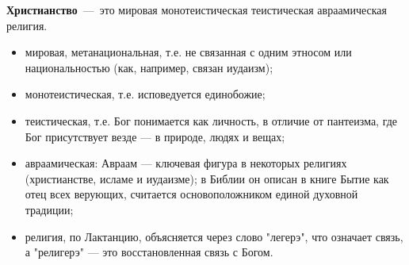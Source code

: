 \textbf{Христианство}~---~это мировая монотеистическая теистическая авраамическая религия.

\begin{itemize}
    \item мировая, метанациональная, т.е. не связанная с одним этносом или национальностью (как, например, связан иудаизм);
    \item монотеистическая, т.е. исповедуется единобожие;
    \item теистическая, т.е. Бог понимается как личность, в отличие от пантеизма, где  Бог присутствует везде — в природе, людях и вещах;
    \item авраамическая: Авраам — ключевая фигура в некоторых религиях (христианстве, исламе и иудаизме); в Библии он описан в книге Бытие как отец всех верующих, считается основоположником единой духовной традиции;
    \item религия, по Лактанцию, объясняется через слово "легерэ", что означает связь, а "религерэ" — это восстановленная связь с Богом.
\end{itemize}



